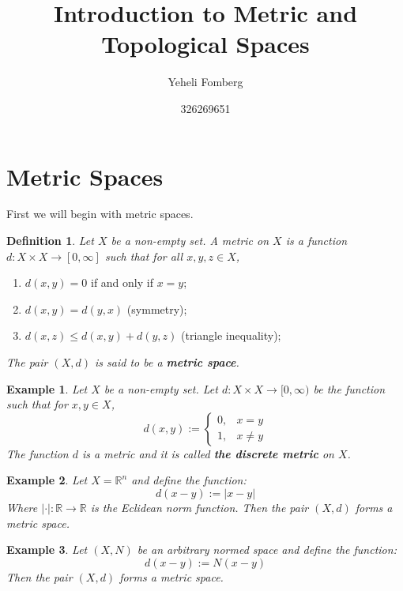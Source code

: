 \documentclass[11pt,a4paper]{article}
\title{\textbf{Introduction to Metric and Topological Spaces}}
\author{Yeheli Fomberg}
\date{326269651}
\theoremstyle{plain}
\newtheorem{definition}{Definition}[section]
\newtheorem{example}{Example}[section]
\newcommand{\R}{\mathbb{R}}
\begin{document}
	\maketitle
	\newpage
	\section{Metric Spaces}
	First we will begin with metric spaces.
	\begin{definition}
	Let $X$ be a non-empty set. A metric on $X$ is a function 
	$d \colon X \times X \to [0,\infty]$ such that for all $x,y,z \in X$,
	\end{definition}
	\begin{enumerate}
	\item $d(x,y) = 0$ if and only if $x = y$;
	\item $d(x,y) = d(y,x)$ (symmetry);
	\item $d(x,z) \le d(x,y) + d(y,z)$ (triangle inequality);
	\end{enumerate}
	\emph{The pair $(X,d)$ is said to be a \textbf{metric space}.}
	\begin{example}
	Let $X$ be a non-empty set. Let $d \colon X \times X \to [0,\infty)$ be
	the function such that for $x,y \in X$,
	\[
		d(x,y) := \begin{cases}
			0, & x=y \\
			1, & x \neq y
		\end{cases}
	\]
	The function $d$ is a metric and it is called \textbf{the discrete metric}
	on $X$.
	\end{example}
	\begin{example}
	Let $X = \R^n$ and define the function:
	\[
		d(x-y) := |x - y|
	\]
	Where $|\cdot | \colon \R \to \R$ is the Eclidean norm function. 
	Then the pair $(X, d)$ forms a metric space.
	\end{example}
	\begin{example}
	Let $(X, N)$ be an arbitrary normed space and define the function:
	\[
		d(x-y) := N(x - y)
	\] 
	Then the pair $(X, d)$ forms a metric space.
	\end{example}
	
	
	
\end{document}
